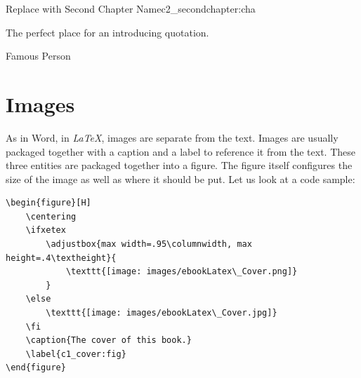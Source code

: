 


\begin{chapterpage}{Replace with Second Chapter Name}{c2_secondchapter:cha}

\begin{myquotation} The perfect place for an introducing quotation.\par\vspace*{15mm}
\mbox{}\hfill \emdash{}Famous Person
\par\end{myquotation}

\end{chapterpage}



\section{Images}\label{c1_images:sec}

As in Word, in \textit{LaTeX}, images are separate from the text. Images are usually packaged together with a caption and a label to reference it from the text. These three entities are packaged together into a figure. The figure itself configures the size of the image as well as where it should be put. Let us look at a code sample:
\begin{lstlisting}
\begin{figure}[H]
	\centering
	\ifxetex
		\adjustbox{max width=.95\columnwidth, max height=.4\textheight}{
			\texttt{[image: images/ebookLatex\_Cover.png]}
		}
	\else
		\texttt{[image: images/ebookLatex\_Cover.jpg]}
	\fi
	\caption{The cover of this book.}
	\label{c1_cover:fig}
\end{figure}
\end{lstlisting}

